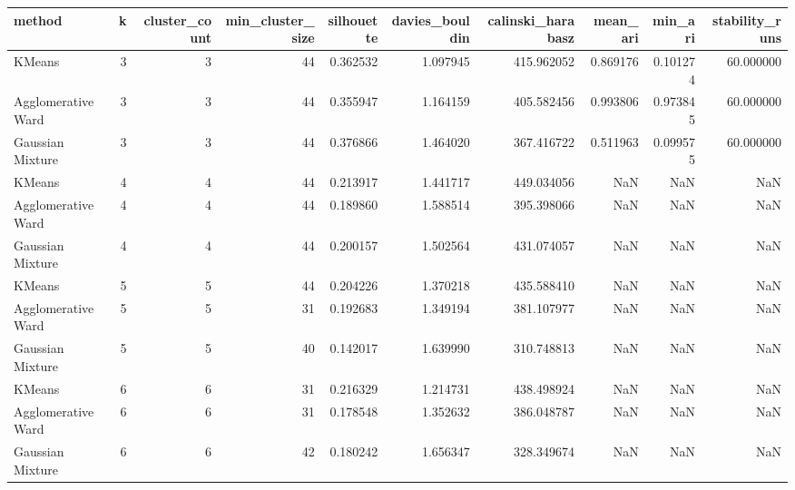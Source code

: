 \begin{tabular}{lrrrrrrrrr}
\toprule
method & k & cluster_count & min_cluster_size & silhouette & davies_bouldin & calinski_harabasz & mean_ari & min_ari & stability_runs \\
\midrule
KMeans & 3 & 3 & 44 & 0.362532 & 1.097945 & 415.962052 & 0.869176 & 0.101274 & 60.000000 \\
Agglomerative Ward & 3 & 3 & 44 & 0.355947 & 1.164159 & 405.582456 & 0.993806 & 0.973845 & 60.000000 \\
Gaussian Mixture & 3 & 3 & 44 & 0.376866 & 1.464020 & 367.416722 & 0.511963 & 0.099575 & 60.000000 \\
KMeans & 4 & 4 & 44 & 0.213917 & 1.441717 & 449.034056 & NaN & NaN & NaN \\
Agglomerative Ward & 4 & 4 & 44 & 0.189860 & 1.588514 & 395.398066 & NaN & NaN & NaN \\
Gaussian Mixture & 4 & 4 & 44 & 0.200157 & 1.502564 & 431.074057 & NaN & NaN & NaN \\
KMeans & 5 & 5 & 44 & 0.204226 & 1.370218 & 435.588410 & NaN & NaN & NaN \\
Agglomerative Ward & 5 & 5 & 31 & 0.192683 & 1.349194 & 381.107977 & NaN & NaN & NaN \\
Gaussian Mixture & 5 & 5 & 40 & 0.142017 & 1.639990 & 310.748813 & NaN & NaN & NaN \\
KMeans & 6 & 6 & 31 & 0.216329 & 1.214731 & 438.498924 & NaN & NaN & NaN \\
Agglomerative Ward & 6 & 6 & 31 & 0.178548 & 1.352632 & 386.048787 & NaN & NaN & NaN \\
Gaussian Mixture & 6 & 6 & 42 & 0.180242 & 1.656347 & 328.349674 & NaN & NaN & NaN \\
\bottomrule
\end{tabular}
